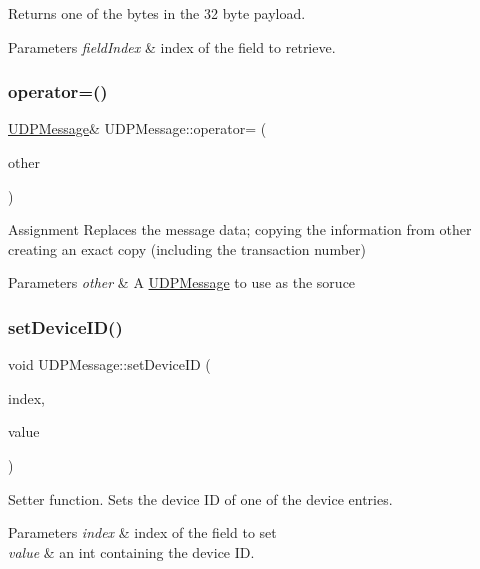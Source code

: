 Returns one of the bytes in the 32 byte payload. 
\begin{DoxyParams}{Parameters}
{\em field\+Index} & index of the field to retrieve. \\
\hline
\end{DoxyParams}
\mbox{\label{class_u_d_p_message_af3bb7f16fec948bcfbf99646b79c5c58}} 
\subsubsection{\texorpdfstring{operator=()}{operator=()}}
{\footnotesize\ttfamily \hyperlink{class_u_d_p_message}{U\+D\+P\+Message}\& U\+D\+P\+Message\+::operator= (\begin{DoxyParamCaption}\item[{const \hyperlink{class_u_d_p_message}{U\+D\+P\+Message} \&}]{other }\end{DoxyParamCaption})\hspace{0.3cm}{\ttfamily [inline]}}

Assignment Replaces the message data; copying the information from other creating an exact copy (including the transaction number) 
\begin{DoxyParams}{Parameters}
{\em other} & A \hyperlink{class_u_d_p_message}{U\+D\+P\+Message} to use as the soruce \\
\hline
\end{DoxyParams}
\mbox{\label{class_u_d_p_message_a9cf9c5e20119a221ee36412e0c1d39c5}} 
\subsubsection{\texorpdfstring{set\+Device\+I\+D()}{setDeviceID()}}
{\footnotesize\ttfamily void U\+D\+P\+Message\+::set\+Device\+ID (\begin{DoxyParamCaption}\item[{unsigned char}]{index,  }\item[{int}]{value }\end{DoxyParamCaption})\hspace{0.3cm}{\ttfamily [inline]}}

Setter function. Sets the device ID of one of the device entries. 
\begin{DoxyParams}{Parameters}
{\em index} & index of the field to set \\
\hline
{\em value} & an int containing the device ID. \\
\hline
\end{DoxyParams}
\mbox{\label{class_u_d_p_message_a2dcad6fc97802808675fb9259727da64}} 
